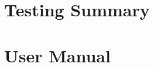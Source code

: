 \documentclass[12pt]{report}
\begin{document}

\appendix
\chapter{Testing Summary}

\chapter{User Manual}
\end{document}
